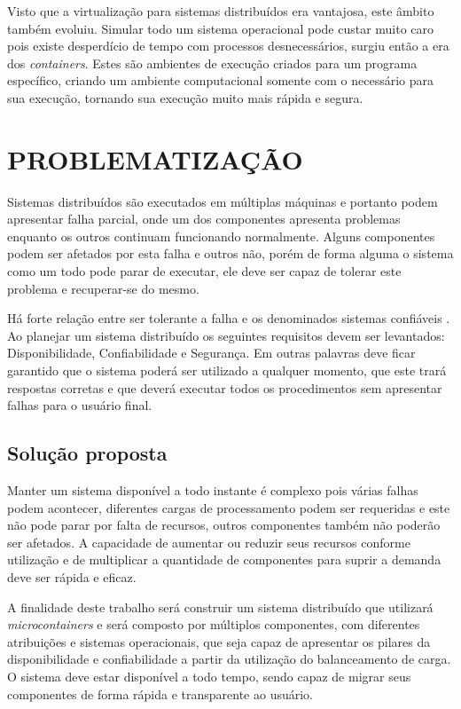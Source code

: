 	Visto que a virtualização para sistemas distribuídos era vantajosa, este âmbito também evoluiu. Simular todo um sistema operacional pode custar muito caro pois existe desperdício de tempo com processos desnecessários, surgiu então a era dos \textit{containers}. Estes são ambientes de execução criados para um programa específico, criando um ambiente computacional somente com o necessário para sua execução, tornando sua execução muito mais rápida e segura.
	
\section{PROBLEMATIZAÇÃO}
	Sistemas distribuídos são executados em múltiplas máquinas e portanto podem apresentar falha parcial, onde um dos componentes apresenta problemas enquanto os outros continuam funcionando normalmente. Alguns componentes podem ser afetados por esta falha e outros não, porém de forma alguma o sistema como um todo pode parar de executar, ele deve ser capaz de tolerar este problema e recuperar-se do mesmo.
	
	Há forte relação entre ser tolerante a falha e os denominados sistemas confiáveis \cite{Tanenbaum}. Ao planejar um sistema distribuído os seguintes requisitos devem ser levantados: Disponibilidade, Confiabilidade e Segurança. Em outras palavras deve ficar garantido que o sistema poderá ser utilizado a qualquer momento, que este trará respostas corretas e que deverá executar todos os procedimentos sem apresentar falhas para o usuário final.
	
\subsection{Solução proposta}
	Manter um sistema disponível a todo instante é complexo pois várias falhas podem acontecer, diferentes cargas de processamento podem ser requeridas e este não pode parar por falta de recursos, outros componentes também não poderão ser afetados. A capacidade de aumentar ou reduzir seus recursos conforme utilização e de multiplicar a quantidade de componentes para suprir a demanda deve ser rápida e eficaz.

	A finalidade deste trabalho será construir um sistema distribuído que utilizará \textit{microcontainers} e será composto por múltiplos componentes, com diferentes atribuições e sistemas operacionais, que seja capaz de apresentar os pilares da disponibilidade e confiabilidade a partir da utilização do balanceamento de carga. O sistema deve estar disponível a todo tempo, sendo capaz de migrar seus componentes de forma rápida e transparente ao usuário.
	
